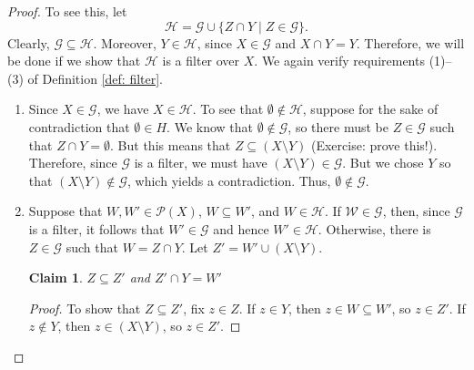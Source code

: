 \documentclass[a4paper]{memoir}
\newtheorem{claim}[theorem]{Claim}
\theoremstyle{definition}
\newcommand{\mc}{\mathcal}
\newcommand{\power}{\ensuremath{\mathscr{P}}}
\begin{document}
\begin{proof}
  To see this, let 
  \[
    \mathcal{H} = \mathcal{G} \cup \{Z \cap Y \mid Z \in \mathcal{G}\}.
  \]
  Clearly, $\mathcal{G} \subseteq \mathcal{H}$. Moreover, $Y \in \mathcal{H}$, since 
  $X \in \mathcal{G}$ and $X \cap Y = Y$. Therefore, we will be done if we show that $\mathcal{H}$ 
  is a filter over $X$. We again verify requirements (1)--(3) of Definition \ref{def: filter}.
  \begin{enumerate}
    \item Since $X \in \mc{G}$, we have $X \in \mc{H}$. To see that $\emptyset \notin \mc{H}$, suppose 
    for the sake of contradiction that $\emptyset \in H$. We know that $\emptyset \notin \mc{G}$, 
    so there must be $Z \in \mc{G}$ such that $Z \cap Y = \emptyset$. But this means 
    that $Z \subseteq (X \setminus Y)$ (Exercise: prove this!). Therefore, since 
    $\mc{G}$ is a filter, we must have $(X \setminus Y) \in \mc{G}$. But we chose $Y$ so that 
    $(X \setminus Y) \notin \mc{G}$, which yields a contradiction. Thus, $\emptyset \notin \mc{G}$.
    \item Suppose that $W, W' \in \power(X)$, $W \subseteq W'$, and $W \in \mc{H}$. If 
    $\mc{W} \in \mc{G}$, then, since $\mc{G}$ is a filter, it follows that $W' \in \mc{G}$ 
    and hence $W' \in \mc{H}$. Otherwise, there is $Z \in \mc{G}$ such that 
    $W = Z \cap Y$. Let $Z' = W' \cup (X \setminus Y)$.
    \begin{claim}
      $Z \subseteq Z'$ and $Z' \cap Y = W'$
    \end{claim}
    
    \begin{proof}
      To show that $Z \subseteq Z'$, fix $z \in Z$. If $z \in Y$, then $z \in W \subseteq W'$, so 
      $z \in Z'$. If $z \notin Y$, then $z \in (X \setminus Y)$, so $z \in Z'$.
      

\end{proof}
\end{enumerate}
\end{proof}
\end{document}
